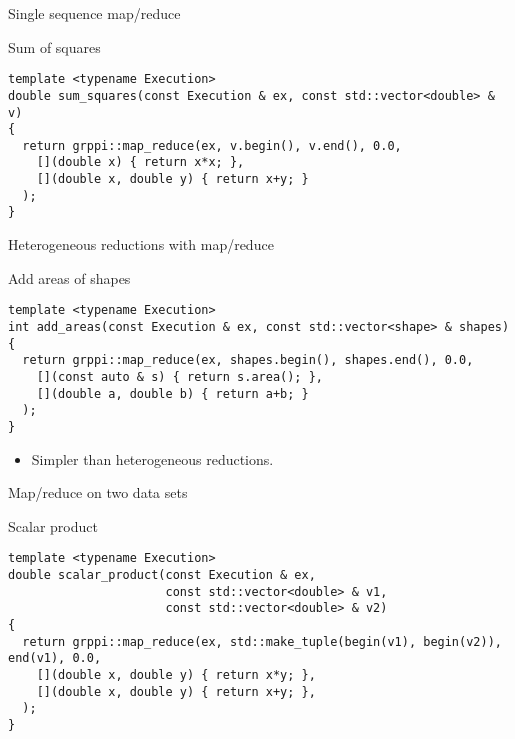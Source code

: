 \begin{frame}[t,fragile]{Single sequence map/reduce}
\begin{block}{Sum of squares}
\begin{lstlisting}
template <typename Execution>
double sum_squares(const Execution & ex, const std::vector<double> & v)
{
  return grppi::map_reduce(ex, v.begin(), v.end(), 0.0,
    [](double x) { return x*x; },
    [](double x, double y) { return x+y; }
  );
}
\end{lstlisting}
\end{block}
\end{frame}

\begin{frame}[t,fragile]{Heterogeneous reductions with map/reduce}
\begin{block}{Add areas of shapes}
\begin{lstlisting}
template <typename Execution>
int add_areas(const Execution & ex, const std::vector<shape> & shapes)
{
  return grppi::map_reduce(ex, shapes.begin(), shapes.end(), 0.0,
    [](const auto & s) { return s.area(); },
    [](double a, double b) { return a+b; } 
  );
}
\end{lstlisting}
\end{block}
\begin{itemize}
  \item Simpler than heterogeneous reductions.
\end{itemize}
\end{frame}



\begin{frame}[t,fragile]{Map/reduce on two data sets}
\begin{block}{Scalar product}
\begin{lstlisting}
template <typename Execution>
double scalar_product(const Execution & ex,
                      const std::vector<double> & v1,
                      const std::vector<double> & v2)
{
  return grppi::map_reduce(ex, std::make_tuple(begin(v1), begin(v2)),  end(v1), 0.0,
    [](double x, double y) { return x*y; },
    [](double x, double y) { return x+y; },
  );
}
\end{lstlisting}
\end{block}
\end{frame}

